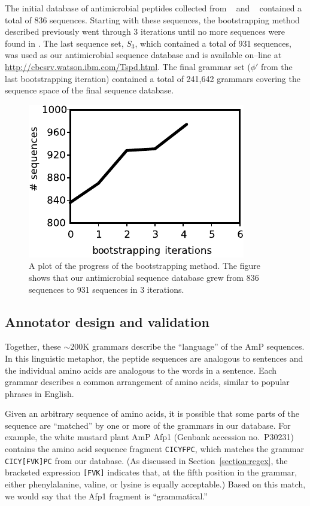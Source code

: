         The initial database of antimicrobial peptides collected from \amsdb~ and \sptr~ contained
        a total of 836 sequences.
        Starting with these sequences, the bootstrapping method
        described previously went through 3 iterations until no more sequences were found
        in \sptr.  The last sequence set, $S_3$, which contained a total of 931 sequences,
        was used as our antimicrobial sequence
        database and is available on--line at \url{http://cbcsrv.watson.ibm.com/Tspd.html}.
        The final grammar set ($\phi'$
        from the last bootstrapping iteration) contained a total of 241,642 grammars
        covering the sequence space of the final sequence database.

        \begin{figure}[ptb]
        \centering
        \includegraphics{Body/Images-chap2/growth.pdf}
        \caption[Graph of the progress of the bootstrapping method.]{
            A plot of the progress of the bootstrapping method.  The figure
            shows that our antimicrobial sequence database grew from 836 sequences
            to 931 sequences in 3 iterations.
        }
        \label{fig:bootProgress}
        \end{figure}

    \subsection{Annotator design and validation}
    Together, these $\sim$200K grammars describe the ``language'' of the
    AmP sequences.  In this linguistic metaphor, the peptide sequences are
    analogous to sentences and the individual amino acids are analogous to
    the words in a sentence.  Each grammar describes a common arrangement
    of amino acids, similar to popular phrases in English.

    Given an arbitrary sequence of amino acids, it is possible that
    some parts of the sequence are ``matched'' by one or more of the
    grammars in our database.  For example, the white mustard plant
    AmP Afp1 (Genbank accession no.\ P30231) contains the amino acid
    sequence fragment \texttt{CICYFPC}, which matches the grammar
    \texttt{CICY[FVK]PC} from our database.  (As discussed in Section~\vref{section:regex},
    the bracketed expression
    \texttt{[FVK]} indicates that, at the fifth position in the grammar,
    either phenylalanine, valine, or lysine is equally acceptable.)  Based on
    this match, we would say that the Afp1 fragment is ``grammatical.''


